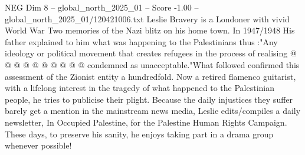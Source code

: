 \begin{textsample}{NEG Dim 8 – global\_north\_2025\_01 – Score -1.00 – global\_north\_2025\_01/120421006.txt}
Leslie Bravery is a Londoner with vivid World War Two memories of the Nazi blitz on his home town.
In 1947/1948 His father explained to him what was happening to the Palestinians thus :"Any ideology or political movement that creates refugees in the process of realising @ @ @ @ @ @ @ @ @ @ condemned as unacceptable."What followed confirmed this assessment of the Zionist entity a hundredfold.
Now a retired flamenco guitarist, with a lifelong interest in the tragedy of what happened to the Palestinian people, he tries to publicise their plight.
Because the daily injustices they suffer barely get a mention in the mainstream news media, Leslie edits/compiles a daily newsletter, In Occupied Palestine, for the Palestine Human Rights Campaign.
These days, to preserve his sanity, he enjoys taking part in a drama group whenever possible!

\end{textsample}
